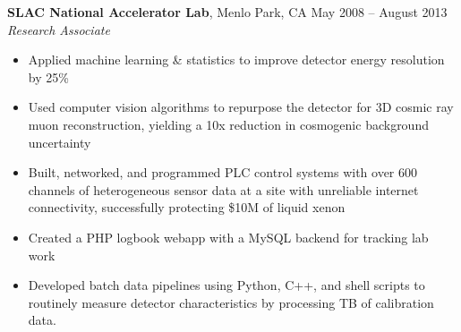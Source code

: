 \documentclass[margin,line]{resume}
\begin{document}
\begin{resume}


    \textbf{SLAC National Accelerator Lab}, Menlo Park, CA \hfill May 2008 -- August 2013\vspace{1mm}\\\vspace{1mm}%
    \textsl{Research Associate}
    \begin{itemize}
    \item Applied machine learning \& statistics to improve detector energy resolution by 25\%
    \item Used computer vision algorithms to repurpose the detector for 3D cosmic ray muon reconstruction, yielding a 10x reduction in cosmogenic background uncertainty
    \item Built, networked, and programmed PLC control systems with over 600 channels of heterogeneous sensor data at a site with unreliable internet connectivity, successfully protecting \$10M of liquid xenon
    \item Created a PHP logbook webapp with a MySQL backend for tracking lab work
    \item Developed batch data pipelines using Python, C++, and shell scripts to routinely measure detector characteristics by processing TB of calibration data.
    \end{itemize}



\end{resume}
\end{document}
